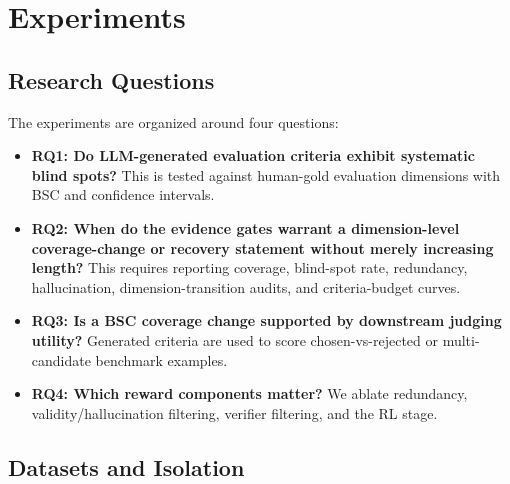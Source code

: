 \section{Experiments}

\subsection{Research Questions}

The experiments are organized around four questions:
\begin{itemize}
  \item \textbf{RQ1: Do LLM-generated evaluation criteria exhibit systematic
  blind spots?} This is tested against human-gold evaluation dimensions with BSC and
  confidence intervals.
  \item \textbf{RQ2: When do the evidence gates warrant a dimension-level
  coverage-change or recovery statement without merely increasing length?} This
  requires reporting coverage, blind-spot rate, redundancy, hallucination,
  dimension-transition audits, and criteria-budget curves.
  \item \textbf{RQ3: Is a BSC coverage change supported by downstream judging utility?}
  Generated criteria are used to score chosen-vs-rejected or multi-candidate
  benchmark examples.
  \item \textbf{RQ4: Which reward components matter?} We ablate redundancy,
  validity/hallucination filtering, verifier filtering, and the RL stage.
\end{itemize}

\subsection{Datasets and Isolation}

